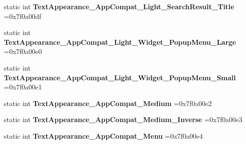 \begin{DoxyCompactItemize}
\item 
\mbox{\label{classandroid_1_1support_1_1graphics_1_1drawable_1_1animated_1_1R_1_1style_a49ba6a36d4fa3f94dd313f2398ad5d89}} 
static int {\bfseries Text\+Appearance\+\_\+\+App\+Compat\+\_\+\+Light\+\_\+\+Search\+Result\+\_\+\+Title} =0x7f0a00df
\item 
\mbox{\label{classandroid_1_1support_1_1graphics_1_1drawable_1_1animated_1_1R_1_1style_aca894ff6a8ace95114eeae55bff1604a}} 
static int {\bfseries Text\+Appearance\+\_\+\+App\+Compat\+\_\+\+Light\+\_\+\+Widget\+\_\+\+Popup\+Menu\+\_\+\+Large} =0x7f0a00e0
\item 
\mbox{\label{classandroid_1_1support_1_1graphics_1_1drawable_1_1animated_1_1R_1_1style_a0541b8b23d726d3a66f038b34a49163c}} 
static int {\bfseries Text\+Appearance\+\_\+\+App\+Compat\+\_\+\+Light\+\_\+\+Widget\+\_\+\+Popup\+Menu\+\_\+\+Small} =0x7f0a00e1
\item 
\mbox{\label{classandroid_1_1support_1_1graphics_1_1drawable_1_1animated_1_1R_1_1style_a19143d2dc66c026bc0bc57078365ff79}} 
static int {\bfseries Text\+Appearance\+\_\+\+App\+Compat\+\_\+\+Medium} =0x7f0a00e2
\item 
\mbox{\label{classandroid_1_1support_1_1graphics_1_1drawable_1_1animated_1_1R_1_1style_adaacfcd0ba7e91ffffff2665f9b4feba}} 
static int {\bfseries Text\+Appearance\+\_\+\+App\+Compat\+\_\+\+Medium\+\_\+\+Inverse} =0x7f0a00e3
\item 
\mbox{\label{classandroid_1_1support_1_1graphics_1_1drawable_1_1animated_1_1R_1_1style_aa738b150fb21fd4093428abf68970ad5}} 
static int {\bfseries Text\+Appearance\+\_\+\+App\+Compat\+\_\+\+Menu} =0x7f0a00e4
\item 
\mbox{\label{classandroid_1_1support_1_1graphics_1_1drawable_1_1animated_1_1R_1_1style_a4c239ec16bcaf7dd4bfe7fcdd86e6ce3}} 

\end{DoxyCompactItemize}
